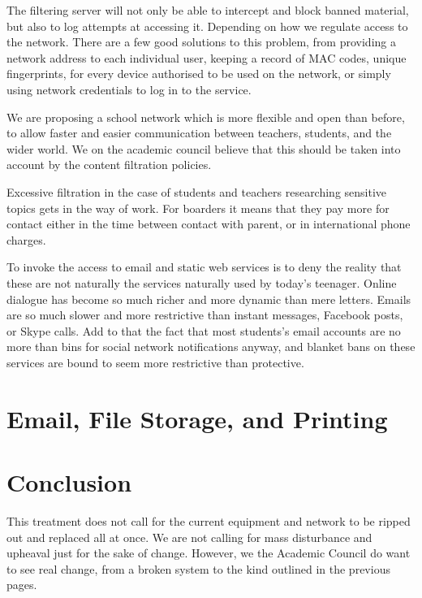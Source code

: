 \documentclass[a4paper,leqno,titlepage]{article}
\begin{document}

The filtering server will not only be able to intercept and block banned
material, but also to log attempts at accessing it. Depending on how we regulate
access to the network. There are a few good solutions to this problem,
from providing a network address to each individual user, keeping a record of
MAC codes, unique fingerprints, for every device authorised to be used on the
network, or simply using network credentials to log in to the service.


We are proposing a school network which is more flexible and open than before,
to allow faster and easier communication between teachers, students, and the
wider world. We on the academic council believe that this should be taken into
account by the content filtration policies.


Excessive filtration in the case of students and teachers researching sensitive
topics gets in the way of work. For boarders it means that they pay more for
contact either in the time between contact with parent, or in international
phone charges.


To invoke the access to email and static web services is to deny the reality
that these are not naturally the services naturally used by today's teenager.
Online dialogue has become so much richer and more dynamic than mere letters.
Emails are so much slower and more restrictive than instant messages, Facebook
posts, or Skype calls. Add to that the fact that most students's email accounts
are no more than bins for social network notifications anyway, and blanket
bans on these services are bound to seem more restrictive than protective.



\section{Email, File Storage, and Printing}\label{Email, File Storage, and Printing}





\break








\section{Conclusion}

This treatment does not call for the current equipment and network to be ripped
out and replaced all at once. We are not calling for mass disturbance and
upheaval just for the sake of change.
However, we the Academic Council do want to see real change, from a
broken system to the kind outlined in the previous pages.
\end{document}
